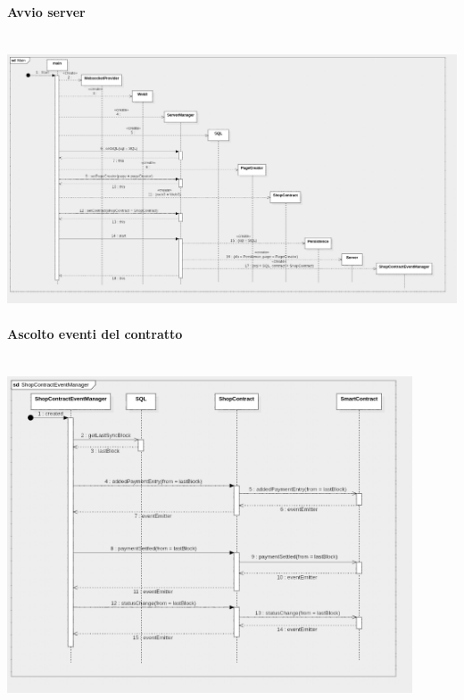 \documentclass[a4paper, 12pt]{article}
\begin{document}
\paragraph{Avvio server}\\
\includegraphics[width=1.0\textwidth]{main}

\paragraph{Ascolto eventi del contratto}\\
\includegraphics[width=0.9\textwidth]{event}
\end{document}
